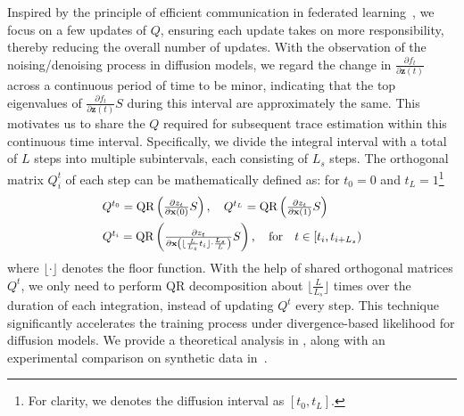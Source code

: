 Inspired by the principle of efficient communication in federated learning~\citep{mcmahan2017fedlearning1}, 
we focus on a few updates of $Q$, ensuring each update takes on more responsibility, thereby reducing the overall number of updates.
With the observation of the noising/denoising process in diffusion models,
we regard the change in $\frac{\partial f_t}{\partial \mathbf{z}(t)}$ across a continuous period of time to be minor, indicating that the top eigenvalues of $\frac{\partial f_t}{\partial \mathbf{z}(t)}S$ during this interval are approximately the same. This motivates us to share the $Q$ required for subsequent trace estimation within this continuous time interval.
Specifically, we divide the integral interval with a total of $L$ steps into multiple subintervals, each consisting of $L_s$ steps.
The orthogonal matrix $Q^t_i$ of each step can be mathematically defined as: for $t_0=0$ and $t_L=1$\footnote{For clarity, we denotes the diffusion interval as $[t_0, t_L]$.}
\begin{align}
\scalebox{0.95}{$
    Q^{t_0} =  \text{QR}\left(\frac{\partial z_t}{\partial \mathbf{x}(0)} S\right), \quad  Q^{t_L} =  \text{QR}\left(\frac{\partial z_t}{\partial \mathbf{x}(1)}S\right) $}\notag \hspace{0.95cm}\\
\scalebox{0.95}{$
    Q^{t_i} = \text{QR}\left(\frac{\partial z_t}{\partial \mathbf{x}\left(\lfloor\frac{L}{L_s} t_i\rfloor \cdot \frac{L_s}{L}\right)}S\right),\quad \text{for}\quad t\in[t_i, t_{i+L_s}) $}\label{eqn:acceleration}
\end{align}
where $\lfloor \cdot\rfloor $ denotes the floor function.
With the help of shared orthogonal matrices $Q^t$, we only need to perform QR decomposition about $\lfloor\frac{L}{L_s}\rfloor$ times over the duration of each integration, instead of updating $Q^t$ every step.
This technique significantly accelerates the training process under divergence-based likelihood for diffusion models.
We provide a theoretical analysis in , along with an experimental comparison on synthetic data in~.





